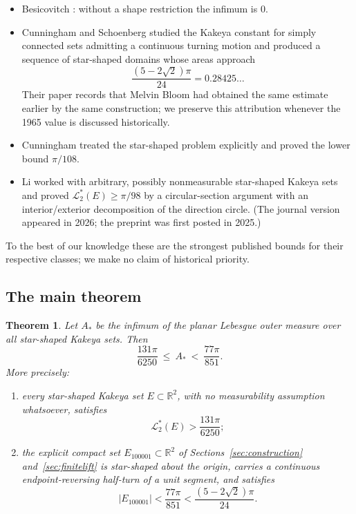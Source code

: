 \documentclass[11pt]{article}
\theoremstyle{plain}
\newtheorem{maintheorem}{Theorem}
\theoremstyle{definition}
\theoremstyle{remark}
\newcommand{\R}{\mathbb{R}}
\newcommand{\Lout}{\mathcal{L}^{*}_{2}}
\newcommand{\Astar}{A_{*}}
\begin{document}
\begin{itemize}
  \item Besicovitch \cite{Besicovitch1928}: without a shape restriction the
    infimum is $0$.
  \item Cunningham and Schoenberg \cite{CunninghamSchoenberg1965} studied the
    Kakeya constant for simply connected sets admitting a continuous turning
    motion and produced a sequence of star-shaped domains whose areas approach
    \[
      \frac{(5-2\sqrt2)\pi}{24}=0.28425\ldots
    \]
    Their paper records that Melvin Bloom had obtained the same estimate earlier
    by the same construction; we preserve this attribution whenever the 1965
    value is discussed historically.
  \item Cunningham \cite{Cunningham1971} treated the star-shaped problem
    explicitly and proved the lower bound $\pi/108$.
  \item Li \cite{Li2026} worked with arbitrary, possibly nonmeasurable
    star-shaped Kakeya sets and proved $\Lout(E)\ge\pi/98$ by a circular-section
    argument with an interior/exterior decomposition of the direction circle.
    (The journal version appeared in 2026; the preprint was first posted in
    2025.)
\end{itemize}

To the best of our knowledge these are the strongest published bounds for their
respective classes; we make no claim of historical priority.

\subsection{The main theorem}

\begin{maintheorem}\label{thm:A}
Let $\Astar$ be the infimum of the planar Lebesgue outer measure over all
star-shaped Kakeya sets. Then
\[
  \boxed{\ \frac{131\pi}{6250}\ \le\ \Astar\ <\ \frac{77\pi}{851}.\ }
\]
More precisely:
\begin{enumerate}
  \item[\textup{(i)}] every star-shaped Kakeya set $E\subset\R^{2}$, with no
    measurability assumption whatsoever, satisfies
    \[
      \Lout(E)>\frac{131\pi}{6250};
    \]
  \item[\textup{(ii)}] the explicit compact set $E_{100001}\subset\R^{2}$ of
    Sections~\ref{sec:construction} and~\ref{sec:finitelift} is star-shaped
    about the origin, carries a continuous endpoint-reversing half-turn of a
    unit segment, and satisfies
    \[
      |E_{100001}|<\frac{77\pi}{851}<\frac{(5-2\sqrt2)\pi}{24}.
    \]
\end{enumerate}
\end{maintheorem}
\end{document}
